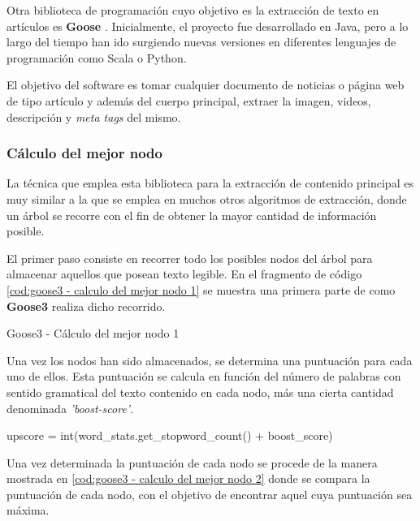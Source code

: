 Otra biblioteca de programación cuyo objetivo es la extracción de texto en artículos es \textbf{Goose} 
\cite{goose3}. Inicialmente, el proyecto fue desarrollado en Java, pero a lo largo del tiempo han ido 
surgiendo nuevas versiones en diferentes lenguajes de programación como Scala o Python.

El objetivo del software es tomar cualquier documento de noticias o página web de tipo artículo y además
del cuerpo principal, extraer la imagen, videos, descripción y \emph{meta tags} del mismo.

\subsubsection{Cálculo del mejor nodo}
\label{subsubsec:calculo del mejor nodo}

La técnica que emplea esta biblioteca para la extracción de contenido principal es muy similar a la que 
se emplea en muchos otros algoritmos de extracción, donde un árbol se recorre con el fin de obtener la 
mayor cantidad de información posible.

El primer paso consiste en recorrer todo los posibles nodos del árbol para almacenar aquellos que posean 
texto legible. En el fragmento de código \ref{cod:goose3 - calculo del mejor nodo 1} se muestra una primera 
parte de como \textbf{Goose3} realiza dicho recorrido.

\begin{codefloat}
  
  \caption{Goose3 - Cálculo del mejor nodo 1}
  \label{cod:goose3 - calculo del mejor nodo 1}
\end{codefloat}

Una vez los nodos han sido almacenados, se determina una puntuación para cada uno de ellos. Esta puntuación 
se calcula en función del número de palabras con sentido gramatical del texto contenido en cada nodo, más
una cierta cantidad denominada \emph{'boost-score'}. 

\begin{Schunk}
  \begin{Soutput}
    upscore = int(word_stats.get_stopword_count() + boost_score)
  \end{Soutput}
\end{Schunk}

Una vez determinada la puntuación de cada nodo se procede de la manera mostrada en 
\ref{cod:goose3 - calculo del mejor nodo 2} donde se compara la puntuación de cada nodo, con el objetivo 
de encontrar aquel cuya puntuación sea máxima.

